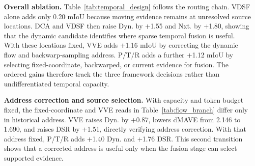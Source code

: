 \documentclass{article}
\begin{document}
\noindent\textbf{Overall ablation.}
Table~\ref{tab:temporal_design} follows the routing chain. VDSF alone adds only
0.20 mIoU because moving evidence remains at unresolved source locations. DCA
and VDSF then raise Dyn. by $+$1.55 and Nxt. by $+$1.80, showing that the dynamic
candidate identifies where sparse temporal fusion is useful. With these
locations fixed, VVE adds $+$1.16 mIoU by correcting the dynamic flow and
backwarp-sampling address. P/T/R adds a further $+$1.12 mIoU by selecting
fixed-coordinate, backwarped, or current evidence for fusion. The ordered gains
therefore track the three framework decisions rather than undifferentiated
temporal capacity.

\noindent\textbf{Address correction and source selection.}
With capacity and token budget fixed, the fixed-coordinate and VVE reads in
Table~\ref{tab:flow_branch} differ only in historical address. VVE raises Dyn. by
$+$0.87, lowers dMAVE from 2.146 to 1.690, and raises DSR by $+$1.51, directly
verifying address correction. With that address fixed, P/T/R adds $+$1.40 Dyn.
and $+$1.76 DSR. This second transition shows that a corrected address is useful
only when the fusion stage can select supported evidence.
\end{document}
